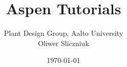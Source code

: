 \documentclass[a4paper,12pt]{book}
\begin{document}
\author{Plant Design Group, Aalto University\\ Oliwer Sliczniuk}
\title{Aspen Tutorials}
\date{\today}

\frontmatter
\maketitle



\tableofcontents

\mainmatter


%


\clearpage
\backmatter


\end{document}
